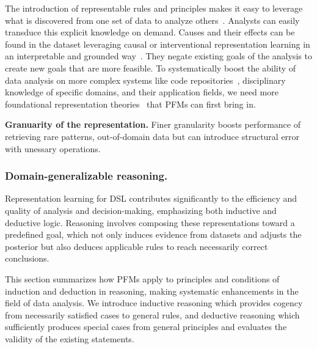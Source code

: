 The introduction of representable rules and principles makes it easy to leverage what is discovered from one set of data to analyze others~\cite{yuan2023power}. Analysts can easily transduce this explicit knowledge on demand. Causes and their effects can be found in the dataset leveraging causal or interventional representation learning in an interpretable and grounded way~\cite{ahuja2023interventional}. They negate existing goals of the analysis to create new goals that are more feasible. To systematically boost the ability of data analysis on more complex systems like code repositories~\cite{jain2024r2e}, disciplinary knowledge of specific domains, and their application fields, we need more foundational representation theories~\cite{yuan2023power} that PFMs can first bring in. 
  



\begin{takeawaybox}
\textbf{Granuarity of the representation. } Finer granularity boosts performance of retrieving rare patterns, out-of-domain data but can introduce structural error with unessary operations.~\cite{zhou2025depth, JongZFSC22, FevrySFCK20}
\end{takeawaybox}



\subsubsection{Domain-generalizable reasoning.}\label{sec:reasoning}
  

Representation learning for DSL contributes significantly to the efficiency and quality of analysis and decision-making, emphasizing both inductive and deductive logic. Reasoning involves composing these representations toward a predefined goal, which not only induces evidence from datasets and adjusts the posterior but also deduces applicable rules to reach necessarily correct conclusions. 
  
This section summarizes how PFMs apply to principles and conditions of induction and deduction in reasoning, making systematic enhancements in the field of data analysis. We introduce inductive reasoning which provides cogency from necessarily satisfied cases to general rules, and deductive reasoning which sufficiently produces special cases from general principles and evaluates the validity of the existing statements.
  
